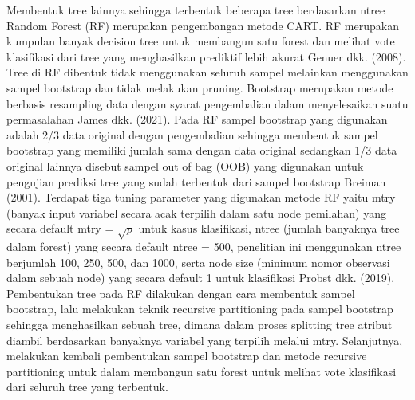 
Membentuk tree lainnya sehingga terbentuk beberapa tree berdasarkan ntree Random Forest (RF) merupakan pengembangan metode CART. RF merupakan kumpulan banyak decision tree untuk membangun satu forest dan melihat vote klasifikasi dari tree yang menghasilkan prediktif lebih akurat Genuer dkk. (2008). Tree di RF dibentuk tidak menggunakan seluruh sampel melainkan menggunakan sampel bootstrap dan tidak melakukan pruning. Bootstrap merupakan metode berbasis resampling data dengan syarat pengembalian dalam menyelesaikan suatu permasalahan James dkk. (2021). Pada RF sampel bootstrap yang digunakan adalah 2/3 data original dengan pengembalian sehingga membentuk sampel bootstrap yang memiliki jumlah sama dengan data original sedangkan 1/3 data original lainnya disebut sampel out of bag (OOB) yang digunakan untuk pengujian prediksi tree yang sudah terbentuk dari sampel bootstrap Breiman (2001).
Terdapat tiga tuning parameter yang digunakan metode RF yaitu mtry (banyak input variabel secara acak terpilih dalam satu node pemilahan) yang secara default mtry = $\sqrt{p}$ untuk kasus klasifikasi, ntree (jumlah banyaknya tree dalam forest) yang secara default ntree = 500, penelitian ini menggunakan ntree berjumlah 100, 250, 500, dan 1000, serta node size (minimum nomor observasi dalam sebuah node) yang secara default 1 untuk klasifikasi Probst dkk. (2019). Pembentukan tree pada RF dilakukan dengan cara membentuk sampel bootstrap, lalu melakukan teknik recursive partitioning pada sampel bootstrap sehingga menghasilkan sebuah tree, dimana dalam proses splitting tree atribut diambil berdasarkan banyaknya variabel yang terpilih melalui mtry. Selanjutnya, melakukan kembali pembentukan sampel bootstrap dan metode recursive partitioning untuk dalam membangun satu forest untuk melihat vote klasifikasi dari seluruh tree yang terbentuk.
